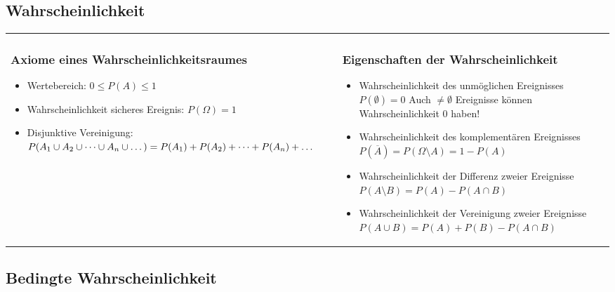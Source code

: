 \documentclass[margin=normal]{tex/hsrzf}
\begin{document}
\subsection{Wahrscheinlichkeit}
\begin{tabular}{m{7.5cm} m{12cm}}
\subsubsection*{Axiome eines Wahrscheinlichkeitsraumes}
\begin{itemize}
    \item Wertebereich: \newline $0 \leq P(A) \leq 1$
    \item Wahrscheinlichkeit sicheres Ereignis: \newline$P(\Omega) = 1$
    \item Disjunktive Vereinigung:\newline $P(A_1 \cup A_2 \cup \dots \cup A_n \cup \dots)
              \newline = P(A_1) + P(A_2) + \dots + P(A_n) + \dots$
\end{itemize}
&
\subsubsection*{Eigenschaften der Wahrscheinlichkeit}


    \begin{itemize}
        \item Wahrscheinlichkeit des unmöglichen Ereignisses \newline $P(\emptyset) = 0$ \newline
              Auch $\neq \emptyset$ Ereignisse können Wahrscheinlichkeit 0 haben!
        \item Wahrscheinlichkeit des komplementären Ereignisses \newline
              $P(\overline{A}) = P(\Omega \setminus A) = 1 - P(A)$
        \item Wahrscheinlichkeit der Differenz zweier Ereignisse \newline
              $P(A \setminus B) = P(A) - P(A \cap B)$
        \item Wahrscheinlichkeit der Vereinigung zweier Ereignisse \newline
              $P(A \cup B) = P(A) + P(B) - P(A \cap B)$

    \end{itemize}
\end{tabular}
\subsection{Bedingte Wahrscheinlichkeit}
\end{document}

